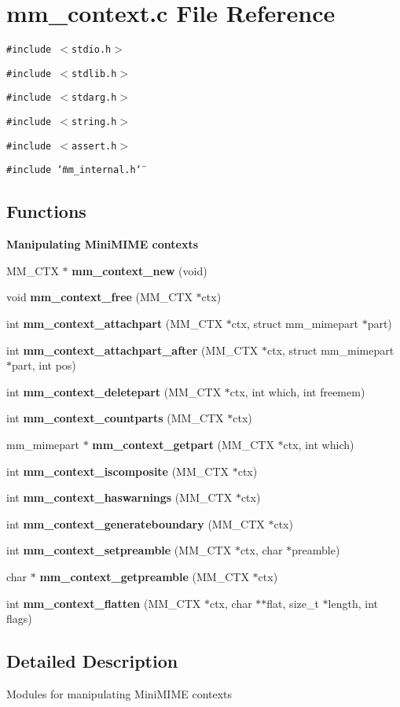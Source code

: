 \section{mm\_\-context.c File Reference}
\label{mm__context_8c}
{\tt \#include $<$stdio.h$>$}\par
{\tt \#include $<$stdlib.h$>$}\par
{\tt \#include $<$stdarg.h$>$}\par
{\tt \#include $<$string.h$>$}\par
{\tt \#include $<$assert.h$>$}\par
{\tt \#include \char`\"{}mm\_\-internal.h\char`\"{}}\par
\subsection*{Functions}
\begin{Indent}{\bf Manipulating Mini\-MIME contexts}\par
\begin{CompactItemize}
\item 
MM\_\-CTX $\ast$ {\bf mm\_\-context\_\-new} (void)
\item 
void {\bf mm\_\-context\_\-free} (MM\_\-CTX $\ast$ctx)
\item 
int {\bf mm\_\-context\_\-attachpart} (MM\_\-CTX $\ast$ctx, struct mm\_\-mimepart $\ast$part)
\item 
int {\bf mm\_\-context\_\-attachpart\_\-after} (MM\_\-CTX $\ast$ctx, struct mm\_\-mimepart $\ast$part, int pos)
\item 
int {\bf mm\_\-context\_\-deletepart} (MM\_\-CTX $\ast$ctx, int which, int freemem)
\item 
int {\bf mm\_\-context\_\-countparts} (MM\_\-CTX $\ast$ctx)
\item 
mm\_\-mimepart $\ast$ {\bf mm\_\-context\_\-getpart} (MM\_\-CTX $\ast$ctx, int which)
\item 
int {\bf mm\_\-context\_\-iscomposite} (MM\_\-CTX $\ast$ctx)
\item 
int {\bf mm\_\-context\_\-haswarnings} (MM\_\-CTX $\ast$ctx)
\item 
int {\bf mm\_\-context\_\-generateboundary} (MM\_\-CTX $\ast$ctx)
\item 
int {\bf mm\_\-context\_\-setpreamble} (MM\_\-CTX $\ast$ctx, char $\ast$preamble)
\item 
char $\ast$ \textbf{mm\_\-context\_\-getpreamble} (MM\_\-CTX $\ast$ctx)\label{group__context_g1ebbdd51106ccdee77ca421f9692bde7}

\item 
int {\bf mm\_\-context\_\-flatten} (MM\_\-CTX $\ast$ctx, char $\ast$$\ast$flat, size\_\-t $\ast$length, int flags)
\end{CompactItemize}
\end{Indent}


\subsection{Detailed Description}
Modules for manipulating Mini\-MIME contexts 